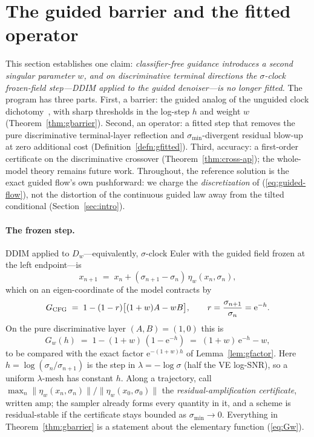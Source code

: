 \documentclass{article} %
\def\eqref#1{equation~\ref{#1}}
\theoremstyle{plain}
\theoremstyle{definition}
\theoremstyle{remark}
\providecommand{\eexp}{\mathrm{e}}
\providecommand{\smin}{\sigma_{\min}}
\providecommand{\Dw}{D_{w}}
\providecommand{\etaw}{\eta_{w}}
\def\eqref#1{(\ref{#1})}
\begin{document}
\section{The guided barrier and the fitted operator}\label{sec:guided-program}

This section establishes one claim:
\emph{classifier-free guidance introduces a second singular parameter $w$,
and on discriminative terminal directions the $\sigma$-clock frozen-field
step---DDIM applied to the guided denoiser---is no longer fitted.} The
program has three parts. First, a barrier: the guided analog of the
unguided clock dichotomy~\citep{ap2026}, with sharp thresholds in the log-step
$h$ and weight $w$
(Theorem~\ref{thm:gbarrier}). Second, an operator: a fitted step that
removes the pure discriminative terminal-layer reflection and
$\smin$-divergent residual blow-up at zero additional cost
(Definition~\ref{defn:gfitted}). Third, accuracy: a first-order certificate on
the discriminative crossover (Theorem~\ref{thm:cross-ap}); the whole-model
theory remains future work. Throughout, the
reference solution is the exact guided flow's own pushforward: we charge
the \emph{discretization} of \eqref{eq:guided-flow}, not the distortion of
the continuous guided law away from the tilted conditional
(Section~\ref{sec:intro}).

\paragraph{The frozen step.}
DDIM applied to $\Dw$---equivalently, $\sigma$-clock Euler with the guided
field frozen at the left endpoint---is
\begin{equation}\label{eq:cfg-step}
  x_{n+1} \;=\; x_n + (\sigma_{n+1}-\sigma_n)\,\etaw(x_n,\sigma_n),
\end{equation}
which on an eigen-coordinate of the model contracts by
\begin{equation}\label{eq:Gcfg}
  G_{\rm CFG} \;=\; 1 - (1-r)\bigl[(1+w)A - wB\bigr],
  \qquad r = \frac{\sigma_{n+1}}{\sigma_n} = \eexp^{-h}.
\end{equation}
On the pure discriminative layer $(A,B)=(1,0)$ this is
\begin{equation}\label{eq:Gw}
  G_w(h) \;=\; 1 - (1+w)\,(1-\eexp^{-h}) \;=\; (1+w)\,\eexp^{-h} - w ,
\end{equation}
to be compared with the exact factor $\eexp^{-(1+w)h}$ of
Lemma~\ref{lem:gfactor}. Here $h = \log(\sigma_n/\sigma_{n+1})$ is the step
in $\lambda = -\log\sigma$ (half the VE log-SNR), so a uniform
$\lambda$-mesh has constant $h$. Along a trajectory, call
$\max_n \|\etaw(x_n,\sigma_n)\|/\|\etaw(x_0,\sigma_0)\|$ the
\emph{residual-amplification certificate}, written $\mathrm{amp}$; the
sampler already forms every quantity in it, and a scheme is residual-stable if
the certificate stays bounded as $\smin \to 0$.
Everything in Theorem~\ref{thm:gbarrier} is a statement about the
elementary function \eqref{eq:Gw}.
\end{document}
